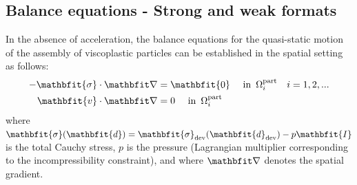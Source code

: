 \documentclass[12pt,review]{elsarticle}
\renewcommand{\ta}[1]{\mathbfit{#1}}
\renewcommand{\ts}[1]{\mathbfit{#1}}
\newcommand{\pore}{\mathrm{pore}}
\newcommand{\particle}{\mathrm{part}}
\newcommand{\contact}{\mathrm{cont}}
\begin{document}
\subsection{Balance equations - Strong and weak formats}

In the absence of acceleration, the balance equations for the quasi-static motion of the assembly of viscoplastic particles can be established in the spatial setting as follows:
\begin{subequations}\label{eq:strong_form}
\begin{align}
    -\ts{\sigma}\cdot\diff & = \ts{0} \quad \mbox{ in }\,\Omega^\particle_i\quad i = 1,2,...
\label{eq:strong_form_v}
\\
    \ta{v}\cdot\diff & = 0 \quad \mbox{ in }\,\Omega^\particle_i
\label{eq:strong_form_p}
\end{align}
\end{subequations}
where $\ts{\sigma}(\ts{d})=\ts{\sigma}_\dev(\ts{d}_\dev)-p\ts{I}$ is the total Cauchy stress, $p$ is the pressure (Lagrangian multiplier corresponding to the incompressibility constraint), and
where $\diff$ denotes the spatial gradient.

\end{document}
